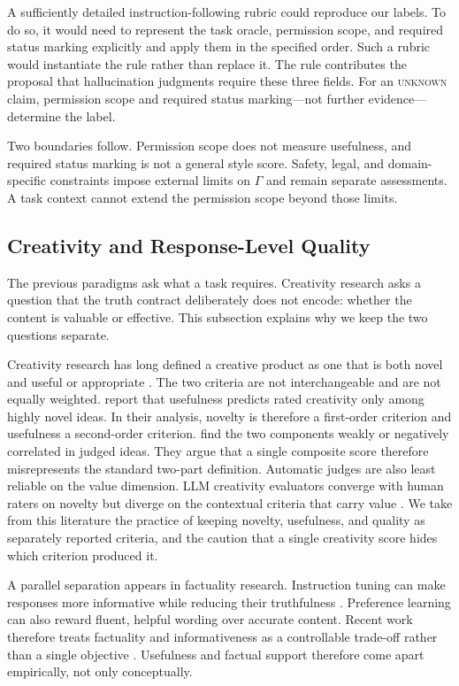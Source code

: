 \documentclass{clv2025}
\begin{document}
A sufficiently detailed instruction-following rubric could reproduce our
labels. To do so, it would need to represent the task oracle, permission scope,
and required status marking explicitly and apply them in the specified order.
Such a rubric would instantiate the rule rather than replace it.
The rule contributes the proposal that hallucination judgments require these
three fields. For an \textsc{unknown} claim, permission scope and required
status marking---not further evidence---determine the label.

Two boundaries follow. Permission scope does not measure usefulness, and
required status marking is not a general style score.
Safety, legal, and domain-specific constraints impose external limits on
$\Gamma$ and remain separate assessments. A task context cannot extend the
permission scope beyond those limits.

\subsection{Creativity and Response-Level Quality}\label{subsec:creativity}

The previous paradigms ask what a task requires.
Creativity research asks a question that the truth contract deliberately does
not encode: whether the content is valuable or effective.
This subsection explains why we keep the two questions separate.

Creativity research has long defined a creative product as one that is both
novel and useful or appropriate \citep{runco_standard_2012}.
The two criteria are not interchangeable and are not equally weighted.
\citet{diedrich_are_2015} report that usefulness predicts rated creativity only
among highly novel ideas. In their analysis, novelty is therefore a first-order
criterion and usefulness a second-order criterion.
\citet{pichot_reflective_2024} find the two components weakly or negatively
correlated in judged ideas. They argue that a single composite score therefore
misrepresents the standard two-part definition.
Automatic judges are also least reliable on the value dimension.
LLM creativity evaluators converge with human raters on novelty but diverge on
the contextual criteria that carry value \citep{lyu_converge_2026}.
We take from this literature the practice of keeping novelty, usefulness, and
quality as separately reported criteria, and the caution that a single
creativity score hides which criterion produced it.

A parallel separation appears in factuality research.
Instruction tuning can make responses more informative while reducing their
truthfulness \citep{wu_balancing_2025}.
Preference learning can also reward fluent, helpful wording over accurate
content. Recent work therefore treats factuality and informativeness as a
controllable trade-off rather than a single objective
\citep{gong_factuality_2026}.
Usefulness and factual support therefore come apart empirically, not only
conceptually.
\end{document}
